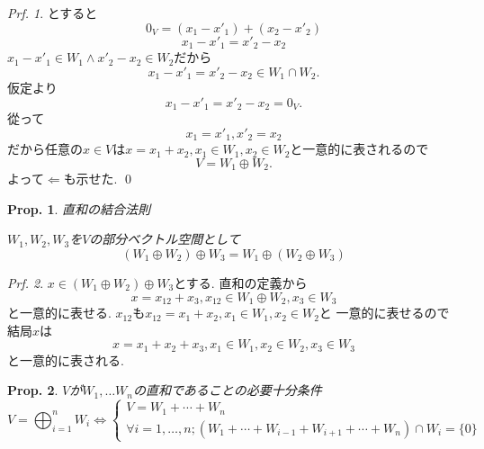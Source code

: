 \documentclass[a4paper,10pt,report]{amsart}
\theoremstyle{plain}
\newtheorem{prop}{Prop.}[section]
\theoremstyle{definition}
\theoremstyle{remark}
\newtheorem{prf}{Prf.}
\begin{document}
\begin{prf}
    とすると
    \begin{equation*}
        0_{V}=(x_{1}-x'_{1})+(x_{2}-x'_{2})
    \end{equation*}
    \begin{equation*}
        x_{1}-x'_{1}=x'_{2}-x_{2}
    \end{equation*}
    \(x_{1}-x'_{1}\in W_{1}\wedge x'_{2}-x_{2}\in W_{2}\)だから
    \begin{equation*}
        x_{1}-x'_{1}=x'_{2}-x_{2}\in W_{1}\cap W_{2}.
    \end{equation*}
    仮定より
    \begin{equation*}
        x_{1}-x'_{1}=x'_{2}-x_{2}=0_{V}.
    \end{equation*}
    從って
    \begin{equation*}
        x_{1}=x'_{1},x'_{2}=x_{2}
    \end{equation*}
    だから任意の\(x\in V\)は\(x=x_{1}+x_{2},x_{1}\in W_{1},x_{2}\in W_{2}\)と一意的に表されるので
    \begin{equation*}
        V=W_{1}\oplus W_{2}.
    \end{equation*}
    よって\(\Leftarrow \)も示せた. 
    \qed{}
\end{prf}
\begin{leftbar}
    \begin{prop}直和の結合法則\par
        \(W_{1},W_{2},W_{3}\)を\(V\)の部分ベクトル空間として
        \begin{equation}
            (W_{1}\oplus W_{2})\oplus W_{3}=W_{1}\oplus(W_{2}\oplus W_{3})
        \end{equation}
    \end{prop}
\end{leftbar}
\begin{prf}
    \(x\in (W_{1}\oplus W_{2})\oplus W_{3}\)とする. 直和の定義から
    \begin{equation*}
        x=x_{12}+x_{3},x_{12}\in W_{1}\oplus W_{2},x_{3}\in W_{3}
    \end{equation*}
    と一意的に表せる. \(x_{12}\)も\(x_{12}=x_{1}+x_{2},x_{1}\in W_{1},x_{2}\in W_{2}\)と
    一意的に表せるので結局\(x\)は
    \begin{equation*}
        x=x_{1}+x_{2}+x_{3},x_{1}\in W_{1},x_{2}\in W_{2},x_{3}\in W_{3}
    \end{equation*}
    と一意的に表される. 
\end{prf}
\begin{leftbar}
    \begin{prop}\(V\)が\(W_{1},\ldots W_{n}\)の直和であることの必要十分条件
        \begin{equation}
            V=\bigoplus_{i=1}^{n}W_{i}\Leftrightarrow
            \begin{cases}
                V=W_{1}+\cdots+W_{n}\\
                \forall i=1,\dots,n;(W_{1}+\cdots+W_{i-1}+W_{i+1}+\cdots+W_{n})\cap W_{i}=\{0\}
            \end{cases}
        \end{equation}
    \end{prop}
\end{leftbar}
\end{document}
